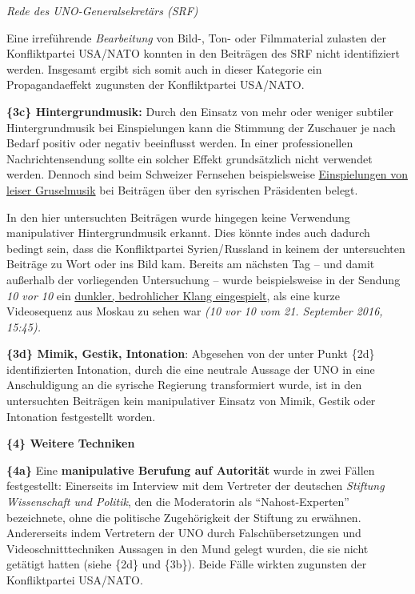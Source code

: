 \emph{Rede des UNO-Generalsekretärs (SRF)}

Eine irreführende \emph{Bearbeitung} von Bild-, Ton- oder Filmmaterial
zulasten der Konfliktpartei USA/NATO konnten in den Beiträgen des SRF
nicht identifiziert werden. Insgesamt ergibt sich somit auch in dieser
Kategorie ein Propagandaeffekt zugunsten der Konfliktpartei USA/NATO.

\textbf{\{3c\} Hintergrundmusik:} Durch den Einsatz von mehr oder
weniger subtiler Hintergrundmusik bei Einspielungen kann die Stimmung
der Zuschauer je nach Bedarf positiv oder negativ beeinflusst werden. In
einer professionellen Nachrichtensendung sollte ein solcher Effekt
grundsätzlich nicht verwendet werden. Dennoch sind beim Schweizer
Fernsehen beispielsweise
\href{http://www.srf.ch/play/tv/10vor10/video/warum-assad-bleibt?id=a6d267c9-52b3-470b-868e-95bb919a0b96}{Einspielungen
von leiser Gruselmusik} bei Beiträgen über den syrischen Präsidenten
belegt.

In den hier untersuchten Beiträgen wurde hingegen keine Verwendung
manipulativer Hintergrund­musik erkannt. Dies könnte indes auch dadurch
bedingt sein, dass die Konfliktpartei Syrien/ Russland in keinem der
untersuchten Beiträge zu Wort oder ins Bild kam. Bereits am nächsten Tag
-- und damit außerhalb der vorliegenden Untersuchung -- wurde
bei­spiels­­weise in der Sendung \emph{10 vor 10} ein
\href{http://www.srf.ch/play/tv/10vor10/video/10vor10-vom-21-09-2016?id=81934d9e-0e10-4ad1-81b0-32da68a8b777\&startTime=945}{dunkler,
bedrohlicher Klang eingespielt}, als eine kurze Videosequenz aus Moskau
zu sehen war \emph{(10 vor 10 vom 21. September 2016, 15:45).}

\textbf{\{3d\} Mimik, Gestik, Intonation}: Abgesehen von der unter Punkt
\{2d\} identifizierten Intonation, durch die eine neutrale Aussage der
UNO in eine Anschuldigung an die syrische Regierung transformiert wurde,
ist in den untersuchten Beiträgen kein manipulativer Einsatz von Mimik,
Gestik oder Intonation festgestellt worden.

\textbf{\{4\} Weitere Techniken}

\textbf{\{4a\}} Eine \textbf{manipulative Berufung auf Autorität} wurde
in zwei Fällen festgestellt: Einerseits im Interview mit dem Vertreter
der deutschen \emph{Stiftung Wissenschaft und Politik}, den die
Moderatorin als ``Nahost-Experten'' bezeichnete, ohne die politische
Zugehörigkeit der Stiftung zu erwähnen. Andererseits indem Vertretern
der UNO durch Falsch­über­setzungen und Videoschnitt­techniken Aussagen
in den Mund gelegt wurden, die sie nicht getätigt hatten (siehe \{2d\}
und \{3b\}). Beide Fälle wirkten zugunsten der Konfliktpartei USA/NATO.

